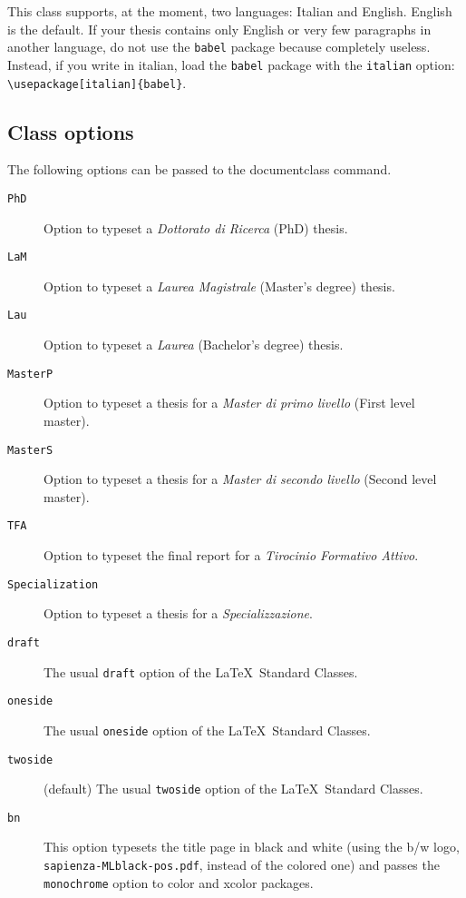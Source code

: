 \documentclass[a5paper,11pt]{article}
\newcommand{\bs}{\textbackslash}
\begin{document}
This class supports, at the moment, two languages: Italian and English. English is the default.
If your thesis contains only English or very few paragraphs in another language, do not use the \texttt{babel} package because completely useless. Instead, if you write in italian, load the \texttt{babel} package with the
\texttt{italian} option: \texttt{\bs usepackage[italian]\{babel\}}.

\subsection{Class options}
\label{class_options}
The following options can be passed to the documentclass command.

\begin{description}
\item[\texttt{PhD}] Option to typeset a \textit{Dottorato di Ricerca} (PhD) thesis.
\item[\texttt{LaM}] Option to typeset a \textit{Laurea Magistrale} (Master's degree) thesis.
\item[\texttt{Lau}] Option to typeset a \textit{Laurea} (Bachelor's degree) thesis.
\item[\texttt{MasterP}] Option to typeset a thesis for a \textit{Master di primo livello} (First level master).
\item[\texttt{MasterS}] Option to typeset a thesis for a \textit{Master di secondo livello} (Second level master).
\item[\texttt{TFA}] Option to typeset the final report for a \textit{Tirocinio Formativo Attivo}.
\item[\texttt{Specialization}] Option to typeset a thesis for a \textit{Specializzazione}.

\item[\texttt{draft}] The usual \texttt{draft} option of the \LaTeX\ Standard Classes.
\item[\texttt{oneside}] The usual \texttt{oneside} option of the \LaTeX\ Standard Classes.
\item[\texttt{twoside}] (default) The usual \texttt{twoside} option of the \LaTeX\ Standard Classes.

\item[\texttt{bn}] This option typesets the title page in black and white
(using the b/w logo, \texttt{sapienza-MLblack-pos.pdf}, instead of the colored one) and passes the \texttt{monochrome} option to \textsf{color} and 
\textsf{xcolor} packages.


\end{description}
\end{document}
